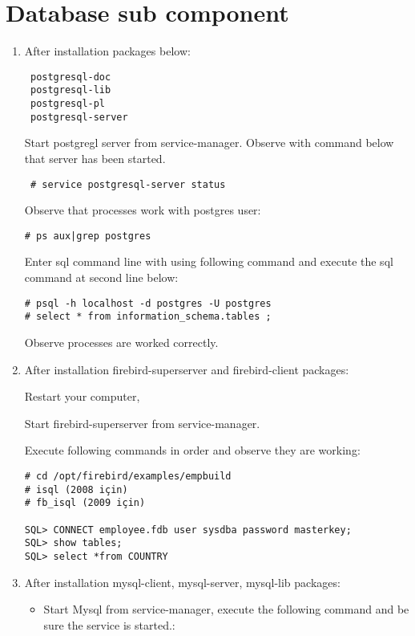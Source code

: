 \documentclass[a4paper,10pt]{article}
\begin{document}
\section{Database sub component}
\begin{enumerate}
 \item After installation packages below:
\begin{verbatim}
 postgresql-doc
 postgresql-lib
 postgresql-pl
 postgresql-server
\end{verbatim}

Start postgregl server from service-manager. Observe with command below that server has been started.
\begin{verbatim}
 # service postgresql-server status
\end{verbatim}

Observe that processes work with postgres user:
\begin{verbatim}
# ps aux|grep postgres 
\end{verbatim}

Enter sql command line with using following command and execute the sql command at second line below:
\begin{verbatim}
# psql -h localhost -d postgres -U postgres
# select * from information_schema.tables ;
\end{verbatim}

Observe processes are worked correctly.

 \item After installation firebird-superserver and firebird-client packages:

Restart your computer,

Start firebird-superserver from service-manager.

Execute following commands in order and observe they are working:
\begin{verbatim}
# cd /opt/firebird/examples/empbuild
# isql (2008 için)
# fb_isql (2009 için)

SQL> CONNECT employee.fdb user sysdba password masterkey;
SQL> show tables;
SQL> select *from COUNTRY
\end{verbatim}

 \item After installation mysql-client, mysql-server, mysql-lib packages:
\begin{itemize}
 \item Start Mysql from service-manager, execute the following command and be sure the service is started.:


\end{itemize}
\end{enumerate}
\end{document}
